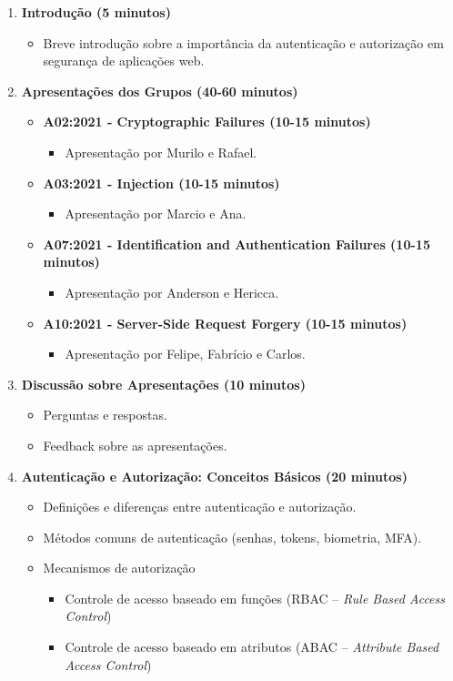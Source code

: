 \documentclass{scrartcl}
\begin{document}
\begin{enumerate}
\item \textbf{\textbf{Introdução (5 minutos)}}
\begin{itemize}
\item Breve introdução sobre a importância da autenticação e autorização em
segurança de aplicações web.
\end{itemize}

\item \textbf{\textbf{Apresentações dos Grupos (40-60 minutos)}}
\begin{itemize}
\item \textbf{\textbf{A02:2021 - Cryptographic Failures (10-15 minutos)}}
\begin{itemize}
\item Apresentação por Murilo e Rafael.
\end{itemize}
\item \textbf{\textbf{A03:2021 - Injection (10-15 minutos)}}
\begin{itemize}
\item Apresentação por Marcio e Ana.
\end{itemize}
\item \textbf{\textbf{A07:2021 - Identification and Authentication Failures (10-15 minutos)}}
\begin{itemize}
\item Apresentação por Anderson e Hericca.
\end{itemize}
\item \textbf{\textbf{A10:2021 - Server-Side Request Forgery (10-15 minutos)}}
\begin{itemize}
\item Apresentação por Felipe, Fabrício e Carlos.
\end{itemize}
\end{itemize}

\item \textbf{\textbf{Discussão sobre Apresentações (10 minutos)}}
\begin{itemize}
\item Perguntas e respostas.
\item Feedback sobre as apresentações.
\end{itemize}

\item \textbf{\textbf{Autenticação e Autorização: Conceitos Básicos (20 minutos)}}
\begin{itemize}
\item Definições e diferenças entre autenticação e autorização.
\item Métodos comuns de autenticação (senhas, tokens, biometria, MFA).
\item Mecanismos de autorização
\begin{itemize}
\item Controle de acesso baseado em funções (RBAC -- \emph{Rule Based Access
Control})
\item Controle de acesso baseado em atributos (ABAC -- \emph{Attribute Based Access
Control})
\end{itemize}
\end{itemize}


\end{enumerate}
\end{document}
